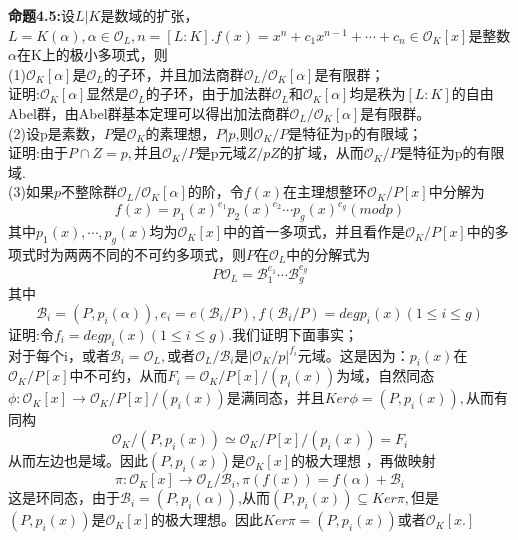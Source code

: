 \documentclass[UTF8]{article}
\begin{document}
\textbf{命题4.5:}设$L|K$是数域的扩张，$L=K(\alpha),\alpha \in \mathcal{O}_{L},n=[L:K].f(x)=x^{n}+c_{1}x^{n-1}+\cdots +c_{n}\in \mathcal{O}_{K}[x]$是整数$\alpha$在K上的极小多项式，则\\
(1)$\mathcal{O}_{K}[\alpha]$是$\mathcal{O}_{L}$的子环，并且加法商群$\mathcal{O}_{L}/\mathcal{O}_{K}[\alpha]$是有限群；\\
证明:$\mathcal{O}_{K}[\alpha]$显然是$\mathcal{O}_{L}$的子环，由于加法群$\mathcal{O}_{L}$和$\mathcal{O}_{K}[\alpha]$均是秩为$[L:K]$的自由Abel群，由Abel群基本定理可以得出加法商群$\mathcal{O}_{L}/\mathcal{O}_{K}[\alpha]$是有限群。\\
(2)设p是素数，$P$是$\mathcal{O}_{K}$的素理想，$P|p$,则$\mathcal{O}_{K}/P$是特征为p的有限域；\\
证明:由于$P\cap Z=p,$并且$\mathcal{O}_{K}/P$是p元域$Z/pZ$的扩域，从而$\mathcal{O}_{K}/P$是特征为p的有限域.\\
(3)如果$p$不整除群$\mathcal{O}_{L}/\mathcal{O}_{K}[\alpha]$的阶，令$f(x)$在主理想整环$\mathcal{O}_{K}/P[x]$中分解为
$$
f(x)=p_{1}(x)^{e_{1}}p_{2}(x)^{e_{2}}\cdots p_{g}(x)^{e_{g}} (mod p)
$$
其中$p_{1}(x),\cdots,p_{g}(x)$均为$\mathcal{O}_{K}[x]$中的首一多项式，并且看作是$\mathcal{O}_{K}/P[x]$中的多项式时为两两不同的不可约多项式，则$P$在$\mathcal{O}_{L}$中的分解式为
$$
P\mathcal{O}_{L}=\mathcal{B}_{1}^{e_{1}}\cdots  \mathcal{B}_{g}^{e_{g}} 
$$
其中
$$
\mathcal{B}_{i}=(P,p_{i}(\alpha)),e_{i}=e(\mathcal{B}_{i}/P),f(\mathcal{B}_{i}/P)=degp_{i}(x)(1\leq i\leq g)
$$
证明:令$f_{i}=degp_{i}(x)(1\leq i \leq g).$我们证明下面事实；\\
对于每个i，或者$\mathcal{B}_{i}=\mathcal{O}_{L},$或者$\mathcal{O}_{L}/\mathcal{B}_{i}$是$|\mathcal{O}_{K}/p|^{f_{i}}$元域。这是因为：$p_{i}(x)$在$\mathcal{O}_{K}/P[x]$中不可约，从而$F_{i}=\mathcal{O}_{K}/P[x]/(p_{i}(x))$为域，自然同态$\phi :\mathcal{O}_{K}[x]\rightarrow \mathcal{O}_{K}/P[x]/(p_{i}(x))$是满同态，并且$Ker\phi=(P,p_{i}(x)),$从而有同构
$$
\mathcal{O}_{K}/(P,p_{i}(x))\simeq \mathcal{O}_{K}/P[x]/(p_{i}(x))=F_{i}
$$
从而左边也是域。因此$(P,p_{i}(x)) $是$\mathcal{O}_{K}[x]$的极大理想 ，再做映射$$
\pi :\mathcal{O}_{K}[x]\rightarrow \mathcal{O}_{L}/\mathcal{B}_{i},\pi (f(x))=f(\alpha)+\mathcal{B}_{i}
$$
这是环同态，由于$\mathcal{B}_{i}=(P,p_{i}(\alpha))$,从而$(P,p_{i}(x))\subseteq Ker\pi,$但是$(P,p_{i}(x))$是$\mathcal{O}_{K}[x]$的极大理想。因此$Ker\pi=(P,p_{i}(x))$或者$\mathcal{O}_{K}[x.]$\\
\end{document}
